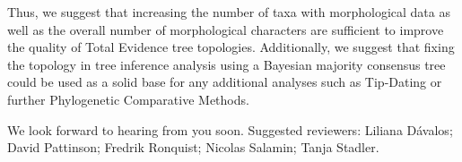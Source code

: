 \documentclass[a4paper,11pt]{article}
\begin{document}
Thus, we suggest that increasing the number of taxa with morphological data as well as the overall number of morphological characters are sufficient to improve the quality of Total Evidence tree topologies. Additionally, we suggest that fixing the topology in tree inference analysis using a Bayesian majority consensus tree could be used as a solid base for any additional analyses such as Tip-Dating or further Phylogenetic Comparative Methods.

We look forward to hearing from you soon.
\newline
\newline
{}
\newline
\newline
{}
\newline
\newline
Suggested reviewers: Liliana D\'{a}valos; David Pattinson; Fredrik Ronquist; Nicolas Salamin; Tanja Stadler.
\end{document}
